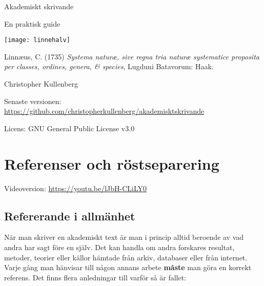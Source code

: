 \documentclass[11pt,a5paper,footinclude=true,headinclude=true]{scrbook} %
\begin{document}
\thispagestyle{empty}
\begin{center}
\begin{LARGE}
Akademiskt skrivande
\end{LARGE}

\bigskip
En praktisk guide


\texttt{[image: linnehalv]}

\begin{scriptsize}
\noindent Linnæus, C. (1735) \emph{Systema naturæ, sive regna tria naturæ systematice proposita per classes, ordines, genera, \& species}, Lugduni Batavorum: Haak.
\end{scriptsize}
\end{center}

\bigskip
\bigskip
\bigskip

\begin{scriptsize}
\noindent Christopher Kullenberg

\noindent Senaste versionen: \href{https://github.com/christopherkullenberg/akademisktskrivande}{https://github.com/christopherkullenberg/akademisktskrivande}

\noindent Licens: GNU General Public License v3.0
\end{scriptsize}

\newpage %
\AtBeginShipoutNext{\AtBeginShipoutDiscard}%

	\tableofcontents
	\thispagestyle{empty}

\newpage %
\AtBeginShipoutNext{\AtBeginShipoutDiscard}%





\chapter{Referenser och röstseparering}

Videoversion: \href{https://youtu.be/lJbH-CLiLY0}{https://youtu.be/lJbH-CLiLY0}

\section{Refererande i allmänhet}

När man skriver en akademiskt text är man i princip alltid beroende av vad andra har sagt före en själv. Det kan handla om andra forskares resultat, metoder, teorier eller källor hämtade från arkiv, databaser eller från internet. Varje gång man hänvisar till någon annans arbete \textbf{måste} man göra en korrekt referens. Det finns flera anledningar till varför så är fallet:
\end{document}

